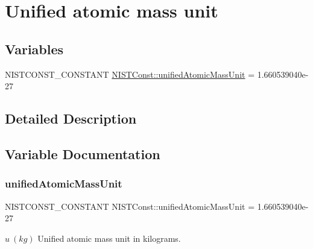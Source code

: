 \hypertarget{group___n_i_s_t_const-_unified_atomic_mass_unit}{}\section{Unified atomic mass unit}
\label{group___n_i_s_t_const-_unified_atomic_mass_unit}
\subsection*{Variables}
\begin{DoxyCompactItemize}
\item 
N\+I\+S\+T\+C\+O\+N\+S\+T\+\_\+\+C\+O\+N\+S\+T\+A\+NT \mbox{\hyperlink{group___n_i_s_t_const-_unified_atomic_mass_unit_ga71274ecfb5b197a764bab758ed6840c9}{N\+I\+S\+T\+Const\+::unified\+Atomic\+Mass\+Unit}} = 1.\+660539040e-\/27
\end{DoxyCompactItemize}


\subsection{Detailed Description}


\subsection{Variable Documentation}
\mbox{\label{group___n_i_s_t_const-_unified_atomic_mass_unit_ga71274ecfb5b197a764bab758ed6840c9}} 
\subsubsection{\texorpdfstring{unified\+Atomic\+Mass\+Unit}{unifiedAtomicMassUnit}}
{\footnotesize\ttfamily N\+I\+S\+T\+C\+O\+N\+S\+T\+\_\+\+C\+O\+N\+S\+T\+A\+NT N\+I\+S\+T\+Const\+::unified\+Atomic\+Mass\+Unit = 1.\+660539040e-\/27}

$u \ (kg)$ Unified atomic mass unit in kilograms. 